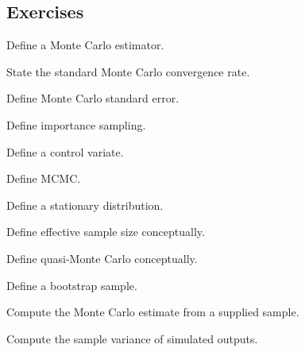 \subsection{Exercises}
\label{subsec:monte-carlo-exercises}

\begin{exercise}[1]
Define a Monte Carlo estimator.
\end{exercise}

\begin{exercise}[1]
State the standard Monte Carlo convergence rate.
\end{exercise}

\begin{exercise}[1]
Define Monte Carlo standard error.
\end{exercise}

\begin{exercise}[1]
Define importance sampling.
\end{exercise}

\begin{exercise}[1]
Define a control variate.
\end{exercise}

\begin{exercise}[1]
Define MCMC.
\end{exercise}

\begin{exercise}[1]
Define a stationary distribution.
\end{exercise}

\begin{exercise}[1]
Define effective sample size conceptually.
\end{exercise}

\begin{exercise}[1]
Define quasi-Monte Carlo conceptually.
\end{exercise}

\begin{exercise}[1]
Define a bootstrap sample.
\end{exercise}

\begin{exercise}[2]
Compute the Monte Carlo estimate from a supplied sample.
\end{exercise}

\begin{exercise}[2]
Compute the sample variance of simulated outputs.
\end{exercise}

